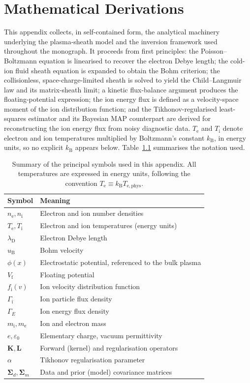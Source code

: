 \chapter{Mathematical Derivations}
\label{app:deriv}

This appendix collects, in self-contained form, the analytical machinery underlying the plasma-sheath model and the inversion framework used throughout the monograph. It proceeds from first principles: the Poisson--Boltzmann equation is linearised to recover the electron Debye length; the cold-ion fluid sheath equation is expanded to obtain the Bohm criterion; the collisionless, space-charge-limited sheath is solved to yield the Child--Langmuir law and its matrix-sheath limit; a kinetic flux-balance argument produces the floating-potential expression; the ion energy flux is defined as a velocity-space moment of the ion distribution function; and the Tikhonov-regularised least-squares estimator and its Bayesian MAP counterpart are derived for reconstructing the ion energy flux from noisy diagnostic data. $T_{\mathrm{e}}$ and $T_{\mathrm{i}}$ denote electron and ion temperatures multiplied by Boltzmann's constant $k_{\mathrm{B}}$, in energy units, so no explicit $k_{\mathrm{B}}$ appears below. Table~\ref{tab:notation} summarises the notation used.

\begin{table}[htbp]
\centering
\caption{Summary of the principal symbols used in this appendix. All temperatures are expressed in energy units, following the convention $T_{\mathrm{e}} \equiv k_{\mathrm{B}} T_{\mathrm{e,phys}}$.}
\label{tab:notation}
\begin{tabular}{@{}ll@{}}
\toprule
Symbol & Meaning \\
\midrule
$n_{\mathrm{e}}, n_{\mathrm{i}}$ & Electron and ion number densities \\
$T_{\mathrm{e}}, T_{\mathrm{i}}$ & Electron and ion temperatures (energy units) \\
$\lambda_{\mathrm{D}}$ & Electron Debye length \\
$u_{\mathrm{B}}$ & Bohm velocity \\
$\phi(x)$ & Electrostatic potential, referenced to the bulk plasma \\
$V_{\mathrm{f}}$ & Floating potential \\
$f_{\mathrm{i}}(v)$ & Ion velocity distribution function \\
$\Gamma_{\mathrm{i}}$ & Ion particle flux density \\
$\Gamma_{E}$ & Ion energy flux density \\
$m_{\mathrm{i}}, m_{\mathrm{e}}$ & Ion and electron mass \\
$e, \varepsilon_{0}$ & Elementary charge, vacuum permittivity \\
$\mathbf{K}, \mathbf{L}$ & Forward (kernel) and regularisation operators \\
$\alpha$ & Tikhonov regularisation parameter \\
$\boldsymbol{\Sigma}_{d}, \boldsymbol{\Sigma}_{m}$ & Data and prior (model) covariance matrices \\
\bottomrule
\end{tabular}
\end{table}

